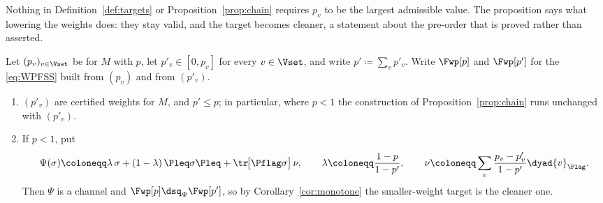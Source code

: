 
Nothing in Definition~\ref{def:targets} or Proposition~\ref{prop:chain}
requires $p_v$ to be the largest admissible value. The proposition says what
lowering the weights does: they stay valid, and the target becomes cleaner, a
statement about the pre-order that is proved rather than asserted.

\begin{proposition}
\label{prop:weight-monotone}
Let $(p_v)_{v\in\Vset}$ be  for $M$ with
 $p$, let $p'_v\in[0,p_v]$ for every $v\in\Vset$, and
write $p'\coloneqq\sum_vp'_v$. Write $\Fwp[p]$ and $\Fwp[p']$ for the
 \eqref{eq:WPFSS}
built from $(p_v)$ and from $(p'_v)$.
\begin{enumerate}[label=(\roman*),leftmargin=3.0em]
\item $(p'_v)$ are certified weights for $M$, and $p'\le p$; in particular,
  where $p<1$ the construction of Proposition~\ref{prop:chain} runs
  unchanged with $(p'_v)$.
\item If $p<1$, put
  \begin{equation}\label{eq:weightmono}
    \Psi(\sigma)\coloneqq\lambda\,\sigma+(1-\lambda)\,\Pleq\sigma\Pleq
     +\tr\!\big[\Pflag\sigma\big]\,\nu,
    \qquad
    \lambda\coloneqq\frac{1-p}{1-p'},
    \qquad
    \nu\coloneqq\sum_v\frac{p_v-p'_v}{1-p'}\dyad{v}_{\Flag}.
  \end{equation}
  Then $\Psi$ is a channel and $\Fwp[p]\dsq_{\Psi}\Fwp[p']$, so by
  Corollary~\ref{cor:monotone} the smaller-weight target is the cleaner one.
\end{enumerate}
\end{proposition}

